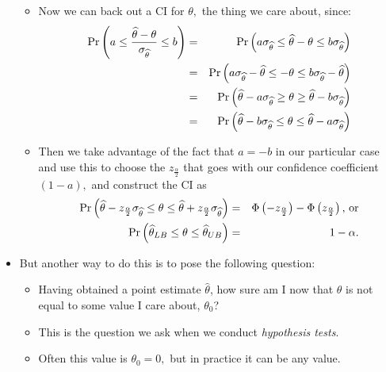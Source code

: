 \documentclass[11pt]{article}
\begin{document}
\begin{itemize}
\begin{itemize}
\item Now we can back out a CI for $\theta ,$ the thing we care about, since:%
\begin{eqnarray*}
\Pr \left( a\leq \frac{\widehat{\theta }-\theta }{\sigma _{\widehat{\theta }}%
}\leq b\right) &=&\Pr \left( a\sigma _{\widehat{\theta }}\leq \widehat{%
\theta }-\theta \leq b\sigma _{\widehat{\theta }}\right) \\
&=&\Pr \left( a\sigma _{\widehat{\theta }}-\widehat{\theta }\leq -\theta
\leq b\sigma _{\widehat{\theta }}-\widehat{\theta }\right) \\
&=&\Pr \left( \widehat{\theta }-a\sigma _{\widehat{\theta }}\geq \theta \geq 
\widehat{\theta }-b\sigma _{\widehat{\theta }}\right) \\
&=&\Pr \left( \widehat{\theta }-b\sigma _{\widehat{\theta }}\leq \theta \leq 
\widehat{\theta }-a\sigma _{\widehat{\theta }}\right)
\end{eqnarray*}

\item Then we take advantage of the fact that $a=-b$ in our particular case
and use this to choose the $z_{\frac{\alpha }{2}}$ that goes with our
confidence coefficient $\left( 1-a\right) ,$ and construct the CI as%
\begin{eqnarray*}
\Pr \left( \widehat{\theta }-z_{\frac{\alpha }{2}}\sigma _{\widehat{\theta }%
}\leq \theta \leq \widehat{\theta }+z_{\frac{\alpha }{2}}\sigma _{\widehat{%
\theta }}\right) &=&\Phi \left( -z_{\frac{\alpha }{2}}\right) -\Phi \left(
z_{\frac{\alpha }{2}}\right) \text{, or} \\
\Pr \left( \widehat{\theta }_{LB}\leq \theta \leq \widehat{\theta }%
_{UB}\right) &=&1-\alpha .
\end{eqnarray*}
\end{itemize}

\item But another way to do this is to pose the following question:

\begin{itemize}
\item Having obtained a point estimate $\widehat{\theta }$, how sure am I
now that $\theta $ is not equal to some value I care about, $\theta _{0}$? \ 

\item This is the question we ask when we conduct \textit{hypothesis tests}.

\item Often this value is $\theta _{0}=0,$ but in practice it can be any
value.


\end{itemize}
\end{itemize}
\end{document}
